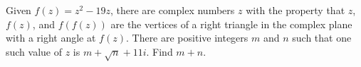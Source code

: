 Given $f\left(z\right)=z^2-19z$, there are complex numbers $z$ with the property that $z$, $f\left(z\right)$, and $f\left(f\left(z\right)\right)$ are the vertices of a right triangle in the complex plane with a right angle at $f\left(z\right)$. There are positive integers $m$ and $n$ such that one such value of $z$ is $m+\sqrt{n}+11i$. Find $m+n$.